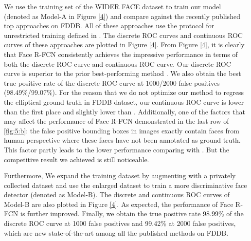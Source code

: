 \documentclass{article} %
\newcommand{\ignore}[1]{}
\begin{document}
We use the training set of the WIDER FACE dataset to train our model (denoted as Model-A in Figure \ref{4}) and compare against the recently published top approaches \cite{sfd,HR,spl,ldcf,conv3d,mxnet} on FDDB. All of these approaches use the protocol for unrestricted training defined in \cite{fddb}. The discrete ROC curves and continuous ROC curves of these approaches are plotted in Figure \ref{4}. From Figure \ref{4}, it is clearly that Face R-FCN consistently achieves the impressive\ignore{state-of-the-art} performance in terms of both the discrete ROC curve and continuous ROC curve. Our discrete ROC curve is superior to the prior best-performing method\ignore{one} \cite{sfd,facercnn}. We also obtain the best true positive rate of the discrete ROC curve at 1000/2000 false positives (98.49\%/99.07\%). For the reason that we do not optimize our method to regress the elliptical ground truth in FDDB dataset, our continuous ROC curve is lower than the first place \cite{sfd} and slightly lower than \cite{facercnn,conv3d}. Additionally, one of the factors that may affect the performance of Face R-FCN demonstrated in the last row of \ref{fig:5:b}: the false positive bounding boxes in images exactly contain faces from human perspective where these faces have not been annotated as ground truth. This factor partly leads to the lower performance comparing with \cite{facercnn,conv3d,sfd}. But the competitive result we achieved is still noticeable.  

Furthermore, We expand the training dataset by augmenting with a privately collected dataset and use the enlarged dataset to train a more discriminative face detector (denoted as Model-B). The discrete and continuous ROC curves of Model-B are also plotted in Figure \ref{4}. 
As expected, the performance of Face R-FCN is further improved. Finally, we obtain the true positive rate 98.99\% of the discrete ROC curve at 1000 false positives and 99.42\% at 2000 false positives, which are new state-of-the-art among all the published methods on FDDB.

\end{document}
